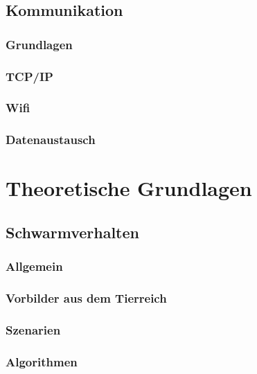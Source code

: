 \subsection{Kommunikation} %

\subsubsection{Grundlagen}
\subsubsection{TCP/IP}
\subsubsection{Wifi}
\subsubsection{Datenaustausch} %

\section{Theoretische Grundlagen}

\subsection{Schwarmverhalten}
\subsubsection{Allgemein}
\subsubsection{Vorbilder aus dem Tierreich}
\subsubsection{Szenarien}
\subsubsection{Algorithmen}
